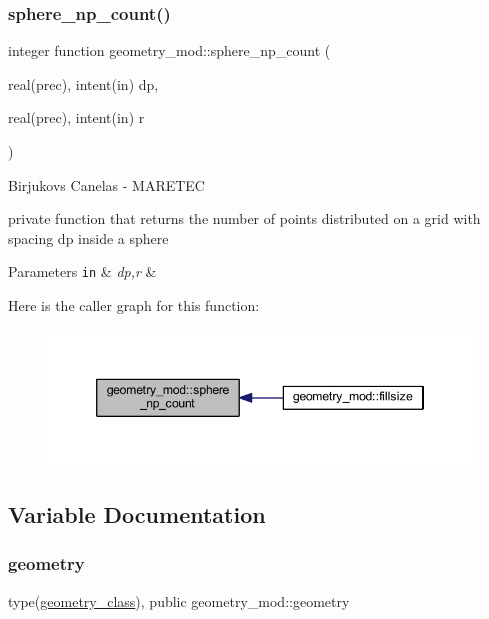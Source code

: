 \subsubsection{\texorpdfstring{sphere\+\_\+np\+\_\+count()}{sphere\_np\_count()}}
{\footnotesize\ttfamily integer function geometry\+\_\+mod\+::sphere\+\_\+np\+\_\+count (\begin{DoxyParamCaption}\item[{real(prec), intent(in)}]{dp,  }\item[{real(prec), intent(in)}]{r }\end{DoxyParamCaption})\hspace{0.3cm}{\ttfamily [private]}}



Birjukovs Canelas -\/ M\+A\+R\+E\+T\+EC 

private function that returns the number of points distributed on a grid with spacing dp inside a sphere 
\begin{DoxyParams}[1]{Parameters}
\mbox{\tt in}  & {\em dp,r} & \\
\hline
\end{DoxyParams}
Here is the caller graph for this function\+:
\nopagebreak
\begin{figure}[H]
\begin{center}
\leavevmode
\includegraphics[width=346pt]{namespacegeometry__mod_a05de7940b4e7df5a2b31f3d0414e3743_icgraph}
\end{center}
\end{figure}


\subsection{Variable Documentation}
\mbox{\label{namespacegeometry__mod_ad2ad4f7e1138beaad5f37d5c15b7b457}} 
\subsubsection{\texorpdfstring{geometry}{geometry}}
{\footnotesize\ttfamily type(\hyperlink{structgeometry__mod_1_1geometry__class}{geometry\+\_\+class}), public geometry\+\_\+mod\+::geometry}

